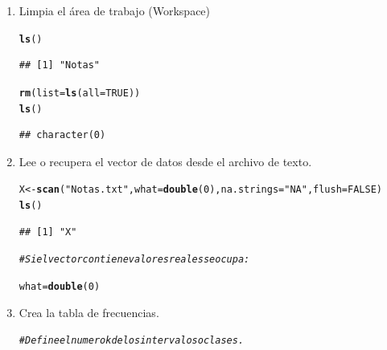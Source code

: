\documentclass[12pt,letterpaper]{article}\usepackage[]{graphicx}\usepackage[]{color}
\makeatletter
\newcommand{\hlnum}[1]{\textcolor[rgb]{0.686,0.059,0.569}{#1}}%
\newcommand{\hlstr}[1]{\textcolor[rgb]{0.192,0.494,0.8}{#1}}%
\newcommand{\hlcom}[1]{\textcolor[rgb]{0.678,0.584,0.686}{\textit{#1}}}%
\newcommand{\hlstd}[1]{\textcolor[rgb]{0.345,0.345,0.345}{#1}}%
\newcommand{\hlkwb}[1]{\textcolor[rgb]{0.69,0.353,0.396}{#1}}%
\newcommand{\hlkwc}[1]{\textcolor[rgb]{0.333,0.667,0.333}{#1}}%
\newcommand{\hlkwd}[1]{\textcolor[rgb]{0.737,0.353,0.396}{\textbf{#1}}}%
\newenvironment{kframe}{%
 \def\at@end@of@kframe{}%
 \ifinner\ifhmode%
  \def\at@end@of@kframe{\end{minipage}}%
  \begin{minipage}{\columnwidth}%
 \fi\fi%
 \def\FrameCommand##1{\hskip\@totalleftmargin \hskip-\fboxsep
 \colorbox{shadecolor}{##1}\hskip-\fboxsep
     \hskip-\linewidth \hskip-\@totalleftmargin \hskip\columnwidth}%
 \MakeFramed {\advance\hsize-\width
   \@totalleftmargin\z@ \linewidth\hsize
   \@setminipage}}%
 {\par\unskip\endMakeFramed%
 \at@end@of@kframe}
\newenvironment{knitrout}{}{} %
\makeatother
\begin{document}
\begin{enumerate}
\item  Limpia el \'area de trabajo (Workspace)
\begin{knitrout}
\color{fgcolor}\begin{kframe}
\begin{alltt}
\hlkwd{ls}\hlstd{()}
\end{alltt}
\begin{verbatim}
## [1] "Notas"
\end{verbatim}
\begin{alltt}
\hlkwd{rm}\hlstd{(}\hlkwc{list}\hlstd{=}\hlkwd{ls}\hlstd{(}\hlkwc{all}\hlstd{=}\hlnum{TRUE}\hlstd{))}
\hlkwd{ls}\hlstd{()}
\end{alltt}
\begin{verbatim}
## character(0)
\end{verbatim}
\end{kframe}
\end{knitrout}

\item  Lee o recupera el vector de datos desde el archivo de texto. 
\begin{knitrout}
\color{fgcolor}\begin{kframe}
\begin{alltt}
\hlstd{X} \hlkwb{<-} \hlkwd{scan}\hlstd{(}\hlstr{"Notas.txt"}\hlstd{,} \hlkwc{what} \hlstd{=} \hlkwd{double}\hlstd{(}\hlnum{0}\hlstd{),} \hlkwc{na.strings} \hlstd{=} \hlstr{"NA"}\hlstd{,} \hlkwc{flush}\hlstd{=}\hlnum{FALSE}\hlstd{)}
\hlkwd{ls}\hlstd{()}
\end{alltt}
\begin{verbatim}
## [1] "X"
\end{verbatim}
\begin{alltt}
\hlcom{# Si el vector contiene valores reales se ocupa:}

\hlstd{what} \hlkwb{=} \hlkwd{double}\hlstd{(}\hlnum{0}\hlstd{)}
\end{alltt}
\end{kframe}
\end{knitrout}

\item Crea la tabla de frecuencias.
\begin{knitrout}
\color{fgcolor}\begin{kframe}
\begin{alltt}
\hlcom{# Define el numero k de los intervalos o clases. }


\end{alltt}
\end{kframe}
\end{knitrout}
\end{enumerate}
\end{document}
